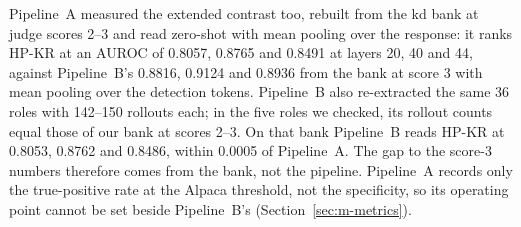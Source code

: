 Pipeline~A measured the extended contrast too, rebuilt from the kd bank at judge scores 2--3 and read zero-shot with mean pooling over the response: it ranks HP-KR at an AUROC of 0.8057, 0.8765 and 0.8491 at layers 20, 40 and 44, against Pipeline~B's 0.8816, 0.9124 and 0.8936 from the bank at score 3 with mean pooling over the detection tokens. %
Pipeline~B also re-extracted the same 36 roles with 142--150 rollouts each; in the five roles we checked, its rollout counts equal those of our bank at scores 2--3. %
On that bank Pipeline~B reads HP-KR at 0.8053, 0.8762 and 0.8486, within 0.0005 of Pipeline~A. %
The gap to the score-3 numbers therefore comes from the bank, not the pipeline. %
Pipeline~A records only the true-positive rate at the Alpaca threshold, not the specificity, so its operating point cannot be set beside Pipeline~B's (Section~\ref{sec:m-metrics}). %

